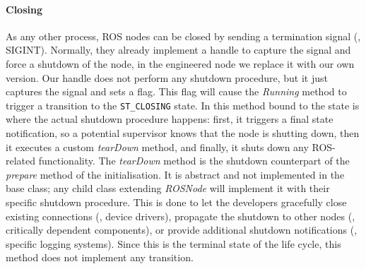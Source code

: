 \paragraph{Closing} As any other process, ROS nodes can be closed by sending a termination signal (\ie, SIGINT). Normally, they already implement a handle to capture the signal and force a shutdown of the node, in the engineered node we replace it with our own version. Our handle does not perform any shutdown procedure, but it just captures the signal and sets a flag. This flag will cause the \textit{Running} method to trigger a transition to the \texttt{ST\_CLOSING} state.  In this method bound to the state is where the actual shutdown procedure happens: first, it triggers a final state notification, so a potential supervisor knows that the node is shutting down, then it executes a custom \textit{tearDown} method, and finally, it shuts down any ROS-related functionality. The \textit{tearDown} method is the shutdown counterpart of the \textit{prepare} method of the initialisation. It is abstract and not implemented in the base class; any child class extending \textit{ROSNode} will implement it with their specific shutdown procedure. This is done to let the developers gracefully close existing connections (\eg, device drivers), propagate the shutdown to other nodes (\eg, critically dependent components), or provide additional shutdown notifications (\eg, specific logging systems). Since this is the terminal state of the life cycle, this method does not implement any transition.

